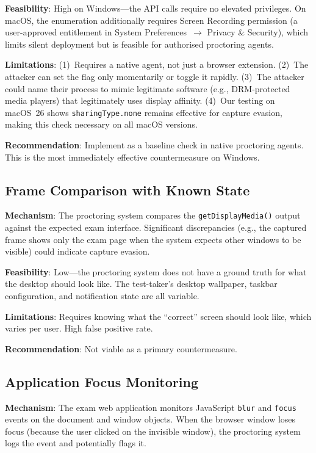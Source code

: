 \documentclass[conference]{IEEEtran}
\begin{document}
\textbf{Feasibility}: High on Windows---the API calls require no elevated privileges. On macOS, the enumeration additionally requires Screen Recording permission (a user-approved entitlement in System Preferences~$\to$ Privacy \& Security), which limits silent deployment but is feasible for authorised proctoring agents.

\textbf{Limitations}: (1)~Requires a native agent, not just a browser extension. (2)~The attacker can set the flag only momentarily or toggle it rapidly. (3)~The attacker could name their process to mimic legitimate software (e.g., DRM-protected media players) that legitimately uses display affinity. (4)~Our testing on macOS~26 shows \texttt{sharingType.none} remains effective for capture evasion, making this check necessary on all macOS versions.

\textbf{Recommendation}: Implement as a baseline check in native proctoring agents. This is the most immediately effective countermeasure on Windows.

\subsection{Frame Comparison with Known State}

\textbf{Mechanism}: The proctoring system compares the \texttt{getDisplayMedia()} output against the expected exam interface. Significant discrepancies (e.g., the captured frame shows only the exam page when the system expects other windows to be visible) could indicate capture evasion.

\textbf{Feasibility}: Low---the proctoring system does not have a ground truth for what the desktop should look like. The test-taker's desktop wallpaper, taskbar configuration, and notification state are all variable.

\textbf{Limitations}: Requires knowing what the ``correct'' screen should look like, which varies per user. High false positive rate.

\textbf{Recommendation}: Not viable as a primary countermeasure.

\subsection{Application Focus Monitoring}

\textbf{Mechanism}: The exam web application monitors JavaScript \texttt{blur} and \texttt{focus} events on the document and window objects. When the browser window loses focus (because the user clicked on the invisible window), the proctoring system logs the event and potentially flags it.
\end{document}
